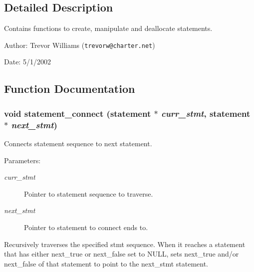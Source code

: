 

\subsection{Detailed Description}
Contains functions to create, manipulate and deallocate statements. 

\begin{Desc}
\item[Author:]Trevor Williams ({\tt trevorw@charter.net}) \end{Desc}
\begin{Desc}
\item[Date:]5/1/2002 \end{Desc}


\subsection{Function Documentation}
\subsubsection{\setlength{\rightskip}{0pt plus 5cm}void statement\_\-connect ({\bf statement} $\ast$ {\em curr\_\-stmt}, {\bf statement} $\ast$ {\em next\_\-stmt})}\label{statement_8h_a3}


Connects statement sequence to next statement. 

\begin{Desc}
\item[Parameters:]
\begin{description}
\item[{\em curr\_\-stmt}]Pointer to statement sequence to traverse. \item[{\em next\_\-stmt}]Pointer to statement to connect ends to.\end{description}
\end{Desc}
Recursively traverses the specified stmt sequence. When it reaches a statement that has either next\_\-true or next\_\-false set to NULL, sets next\_\-true and/or next\_\-false of that statement to point to the next\_\-stmt statement. 
